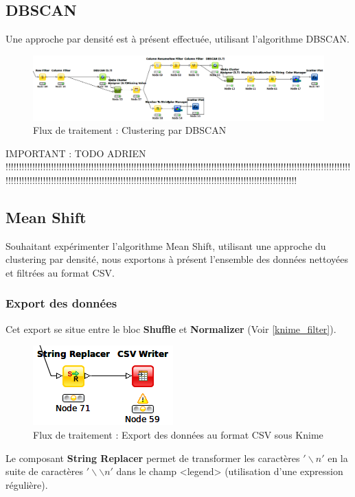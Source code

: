 \subsection{DBSCAN}
Une approche par densité est à présent effectuée, utilisant l'algorithme DBSCAN.

\begin{figure}[H]
    \centering
    \includegraphics[width=\linewidth]{img/knime_dbscan.png}
    \caption{Flux de traitement : Clustering par DBSCAN}
\end{figure}

IMPORTANT : TODO ADRIEN !!!!!!!!!!!!!!!!!!!!!!!!!!!!!!!!!!!!!!!!!!!!!!!!!!!!!!!!!!!!!!!!!!!!!!!!!!!!!!!!!!!!!!!!!!!!!!!!!!!!!!!!!!!!!!!!!!!!!!!!!!!!!!!!!!!!!!!!!!!!!!!!!!!!!!!!!!!!!!!!!!!!!!!!!!!!!!!!!!!!!!!!!!!!!!!!!!!!!!!!!!!!!!!!!!!!!!!!!!!!!!!!!!!!!!!!!!!!!!
\pagebreak




\subsection{Mean Shift}
Souhaitant expérimenter l'algorithme Mean Shift, utilisant une approche du clustering par densité, nous exportons à présent l'ensemble des données nettoyées et filtrées au format CSV.

\subsubsection{Export des données}
Cet export se situe entre le bloc \textbf{Shuffle} et \textbf{Normalizer} (Voir \ref{knime_filter}).

\begin{figure}[H]
    \centering
    \includegraphics[width=0.25\linewidth]{img/knime_csvwriter.png}
    \caption{Flux de traitement : Export des données au format CSV sous Knime}
\end{figure}

Le composant \textbf{String Replacer} permet de transformer les caractères $'\backslash n'$ en la suite de caractères $'\backslash \backslash n'$ dans le champ <legend> (utilisation d'une expression régulière).

